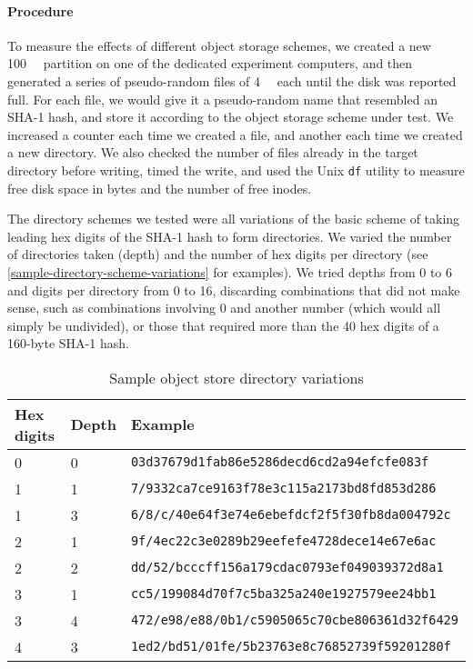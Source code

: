 %


\paragraph{Procedure}

To measure the effects of different object storage schemes, we created a new
\SI{100}{\mebi\byte} partition on one of the dedicated experiment computers, and then generated a series
of pseudo-random files of \SI{4}{\kibi\byte} each until the disk was reported
full. For each file, we would give it a pseudo-random name that resembled an
SHA-1 hash, and store it according to the object storage scheme under test. We
increased a counter each time we created a file, and another each time we
created a new directory. We also checked the number of files already in the
target directory before writing, timed the write, and used the Unix
\lstinline{df} utility to measure free disk space in bytes and the number of
free inodes.

The directory schemes we tested were all variations of the basic scheme of
taking leading hex digits of the SHA-1 hash to form directories. We varied the
number of directories taken (depth) and the number of hex digits per directory
(see \autoref{sample-directory-scheme-variations} for examples). We tried depths
from \num{0} to \num{6} and digits per directory from \num{0} to \num{16},
discarding combinations that did not make sense, such as combinations involving
\num{0} and another number (which would all simply be undivided), or those that
required more than the \num{40} hex digits of a \num{160}-byte SHA-1 hash.

\begin{table}[]
    \caption{Sample object store directory variations}
    \label{sample-directory-scheme-variations}
    \centering
    \begin{tabular}{l l l}
        Hex digits & Depth & Example \\
        \midrule
        0 & 0 & \lstinline{03d37679d1fab86e5286decd6cd2a94efcfe083f} \\
        1 & 1 & \lstinline{7/9332ca7ce9163f78e3c115a2173bd8fd853d286} \\
        1 & 3 & \lstinline{6/8/c/40e64f3e74e6ebefdcf2f5f30fb8da004792c} \\
        2 & 1 & \lstinline{9f/4ec22c3e0289b29eefefe4728dece14e67e6ac} \\
        2 & 2 & \lstinline{dd/52/bcccff156a179cdac0793ef049039372d8a1} \\
        3 & 1 & \lstinline{cc5/199084d70f7c5ba325a240e1927579ee24bb1} \\
        3 & 4 & \lstinline{472/e98/e88/0b1/c5905065c70cbe806361d32f6429} \\
        4 & 3 & \lstinline{1ed2/bd51/01fe/5b23763e8c76852739f59201280f} \\
    \end{tabular}
\end{table}

